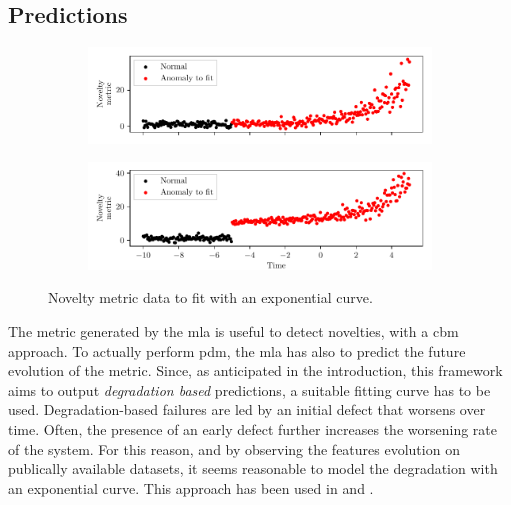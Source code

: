 \subsection{Predictions}
\label{sec:predictions}
\begin{figure}
    \centering
    \begin{subfigure}{\textwidth}
        \includegraphics[width=\linewidth]{images/Framework/EXP_1.pdf}
        \caption{}
        \label{fig:exp_degradation_1}
    \end{subfigure}
    \begin{subfigure}{\textwidth}
        \includegraphics[width=\linewidth]{images/Framework/EXP_2.pdf}
        \caption{}
        \label{fig:exp_degradation_2}
    \end{subfigure}
    \caption{Novelty metric data to fit with an exponential curve.}
    \label{fig:mainfig}
    \label{fig:exp_degradation}
\end{figure}

The metric generated by the \gls{mla} is useful to detect novelties, with a \gls{cbm} approach. To actually perform \gls{pdm}, the \gls{mla} has also to predict the future evolution of the metric. Since, as anticipated in the introduction, this framework aims to output \emph{degradation based} predictions, a suitable fitting curve has to be used. Degradation-based failures are led by an initial defect that worsens over time. Often, the presence of an early defect further increases the worsening rate of the system. For this reason, and by observing the features evolution on publically available datasets, it seems reasonable to model the degradation with an exponential curve. This approach has been used in \cite{exp_degradation} and \cite{exp_degradation_NeuralNN}.

